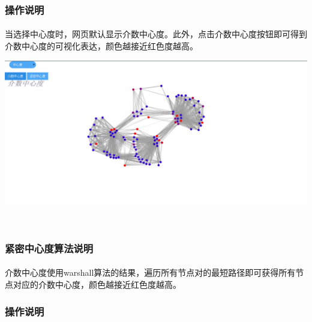 \documentclass{article}
\begin{document}
\begin{CJK}{UTF8}{gkai}
		\subsubsection{操作说明} %
			\paragraph{}
			当选择中心度时，网页默认显示介数中心度。此外，点击介数中心度按钮即可得到介数中心度的可视化表达，颜色越接近红色度越高。
		\\[\intextsep] 
		\begin{minipage}{\textwidth} 
		    \centering 
		    \includegraphics[width=0.9\linewidth]{bc.PNG}
		\end{minipage} 
		\\[\intextsep] 

		\subsubsection{紧密中心度算法说明}
			\paragraph{}
			介数中心度使用warshall算法的结果，遍历所有节点对的最短路径即可获得所有节点对应的介数中心度，颜色越接近红色度越高。
		\subsubsection{操作说明} %

\end{CJK}
\end{document}
